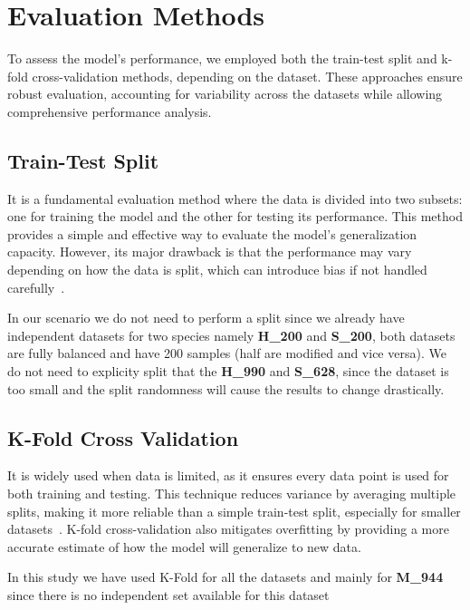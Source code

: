 \section{Evaluation Methods}\label{sec:evaluation-methods}
  To assess the model's performance, we employed both the train-test split and k-fold cross-validation methods, depending on the dataset.
  These approaches ensure robust evaluation, accounting for variability across the datasets while allowing comprehensive performance analysis.

  \subsection{Train-Test Split}\label{subsec:train-test-split}
    It is a fundamental evaluation method where the data is divided into two subsets: one for training the model and the other for testing its performance.
    This method provides a simple and effective way to evaluate the model's generalization capacity.
    However, its major drawback is that the performance may vary depending on how the data is split, which can introduce bias if not handled carefully~\cite{chou_remarks_2011, chou_using_2005}.

    In our scenario we do not need to perform a split since we already have independent datasets for two species namely \textbf{H\_200} and \textbf{S\_200}, both datasets are fully balanced and have 200 samples (half are modified and vice versa).
    We do not need to explicity split that the \textbf{H\_990} and \textbf{S\_628}, since the dataset is too small and the split randomness will cause the results to change drastically.

  \subsection{K-Fold Cross Validation}\label{subsec:k-fold-cross-validation}
    It is widely used when data is limited, as it ensures every data point is used for both training and testing.
    This technique reduces variance by averaging multiple splits, making it more reliable than a simple train-test split, especially for smaller datasets~\cite{chou_signal-cf_2007}.
    K-fold cross-validation also mitigates overfitting by providing a more accurate estimate of how the model will generalize to new data.

    In this study we have used K-Fold for all the datasets and mainly for \textbf{M\_944} since there is no independent set available for this dataset

